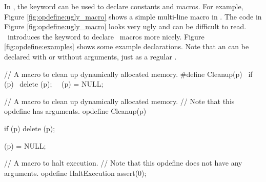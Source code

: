 In \cpp, the  keyword can be used to declare constants and macros.  For example, Figure \ref{fig:opdefine:ugly_macro} shows a simple multi-line macro in \cpp.  The code in Figure \ref{fig:opdefine:ugly_macro} looks very ugly and can be difficult to read.  \opCPP\ introduces the  keyword to declare \cpp\ macros more nicely.  Figure \ref{fig:opdefine:examples} shows some example  declarations.  Note that an  can be declared with or without arguments, just as a regular .  

\begin{opcpp}[label={fig:opdefine:ugly_macro},caption={A simple multi-line \cpp\ macro.}]
// A macro to clean up dynamically allocated memory.
#define Cleanup(p) \
   if (p)          \
      delete (p);  \
                   \
   (p) = NULL;
\end{opcpp}

\begin{opcpp}[label={fig:opdefine:examples},caption={Example \opcppk{opdefine} declarations.}]
// A macro to clean up dynamically allocated memory.
// Note that this opdefine has arguments.
opdefine Cleanup(p)
{
   if (p)
      delete (p);

   (p) = NULL;
}

// A macro to halt execution.
// Note that this opdefine does not have any arguments.
opdefine HaltExecution
{ 
    assert(0); 
}
\end{opcpp}

